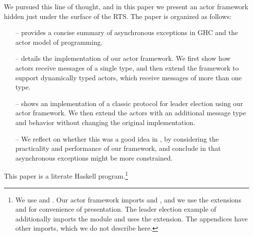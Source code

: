 \documentclass[sigplan,screen]{acmart}
\begin{document}
We pursued this line of thought, and in this paper we present an actor
framework hidden just under the surface of the RTS.
%
The paper is organized as follows:
\begin{itemize}[leftmargin=1.5em]
    \item[--]  provides a concise summary of asynchronous
    exceptions in GHC and the actor model of programming.

    \item[--]  details the implementation of our
    actor framework. We first show how actors receive messages of a single
    type, and then extend the framework to support dynamically typed actors,
    which receive messages of more than one type.

    \item[--]  shows an implementation of a classic
    protocol for leader election using our actor framework. We then extend the actors with an
    additional message type and behavior without changing the original
    implementation.

    \item[--] We reflect on whether this was a good idea in
    ,
    by considering the practicality and performance of our framework,
    and conclude in  that asynchronous exceptions
    might be more constrained.
\end{itemize}
This paper is a literate Haskell program.\footnote{
    We use  and .
    Our actor framework imports  and
    , and we use the extensions 
    and  for convenience of presentation.
    The leader election example of  additionally imports the module 
    and uses the  extension.
    The appendices have other imports, which we do not describe here.
}
\end{document}
